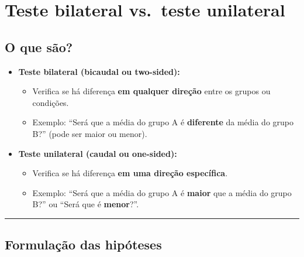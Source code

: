 \documentclass[
]{book}
\providecommand{\tightlist}{%
  \setlength{\itemsep}{0pt}\setlength{\parskip}{0pt}}
\begin{document}
\section{Teste bilateral vs.~teste unilateral}\label{teste-bilateral-vs.-teste-unilateral}

\subsection{O que são?}\label{o-que-suxe3o}

\begin{itemize}
\tightlist
\item
  \textbf{Teste bilateral (bicaudal ou two-sided):}

  \begin{itemize}
  \tightlist
  \item
    Verifica se há diferença \textbf{em qualquer direção} entre os grupos ou condições.
  \item
    Exemplo: ``Será que a média do grupo A é \textbf{diferente} da média do grupo B?'' (pode ser maior ou menor).
  \end{itemize}
\item
  \textbf{Teste unilateral (caudal ou one-sided):}

  \begin{itemize}
  \tightlist
  \item
    Verifica se há diferença \textbf{em uma direção específica}.
  \item
    Exemplo: ``Será que a média do grupo A é \textbf{maior} que a média do grupo B?'' ou ``Será que é \textbf{menor}?''.
  \end{itemize}
\end{itemize}

\begin{center}\rule{0.5\linewidth}{0.5pt}\end{center}

\subsection{Formulação das hipóteses}\label{formulauxe7uxe3o-das-hipuxf3teses}
\end{document}
